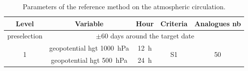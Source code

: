 \documentclass[twocol]{ametsoc}
\begin{document}

% 


%

\begin{table}[htbp]
	\footnotesize
	\caption{Parameters of the reference method on the atmospheric circulation.}
	\begin{center}
		\begin{tabular}{ccccc}
			\hline \textbf{Level} & \textbf{Variable} & \textbf{Hour} & \textbf{Criteria} & \textbf{Analogues nb} \\ 
			\hline 
			preselection & \multicolumn{4}{c}{$\pm 60$ days around the target date} \\
			\hline 
			\multirow{2}{*}{1} & geopotential hgt 1000~hPa & 12~h & \multirow{2}{*}{S1} & \multirow{2}{*}{50} \\
			& geopotential hgt 500~hPa & 24~h & & \\ 
			\hline 
		\end{tabular} 
	\end{center}
	\label{table_params_R1}
\end{table}
\end{document}
